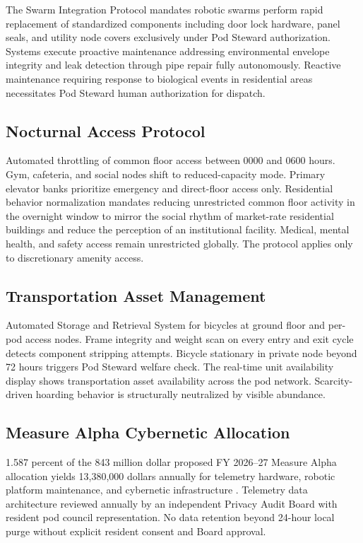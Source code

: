 \documentclass[12pt, letterpaper]{article}
\begin{document}
The Swarm Integration Protocol mandates robotic swarms perform rapid replacement of standardized components including door lock hardware, panel seals, and utility node covers exclusively under Pod Steward authorization. Systems execute proactive maintenance addressing environmental envelope integrity and leak detection through pipe repair fully autonomously. Reactive maintenance requiring response to biological events in residential areas necessitates Pod Steward human authorization for dispatch.

\subsection{Nocturnal Access Protocol}
Automated throttling of common floor access between 0000 and 0600 hours. Gym, cafeteria, and social nodes shift to reduced-capacity mode. Primary elevator banks prioritize emergency and direct-floor access only. Residential behavior normalization mandates reducing unrestricted common floor activity in the overnight window to mirror the social rhythm of market-rate residential buildings and reduce the perception of an institutional facility. Medical, mental health, and safety access remain unrestricted globally. The protocol applies only to discretionary amenity access.

\subsection{Transportation Asset Management}

Automated Storage and Retrieval System for bicycles at ground floor and per-pod access nodes. Frame integrity and weight scan on every entry and exit cycle detects component stripping attempts. Bicycle stationary in private node beyond 72 hours triggers Pod Steward welfare check. The real-time unit availability display shows transportation asset availability across the pod network. Scarcity-driven hoarding behavior is structurally neutralized by visible abundance.

\subsection{Measure Alpha Cybernetic Allocation}

1.587 percent of the 843 million dollar proposed FY 2026--27 Measure Alpha allocation yields 13,380,000 dollars annually for telemetry hardware, robotic platform maintenance, and cybernetic infrastructure \citep{lac_ceo_measure_a_2025}. Telemetry data architecture reviewed annually by an independent Privacy Audit Board with resident pod council representation. No data retention beyond 24-hour local purge without explicit resident consent and Board approval.
\end{document}
